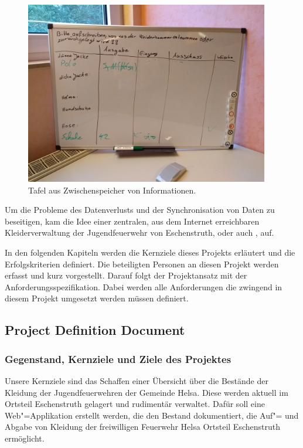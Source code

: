 \begin{figure}[hbtp]
  \centering
  \includegraphics[width=0.95\textwidth]{res/IMG_20180815_193814370}
  \caption{Tafel aus Zwischenspeicher von Informationen.}
  \label{fig:tafel}
\end{figure}

Um die Probleme des Datenverlusts und der Synchronisation von Daten zu beseitigen, kam die Idee einer zentralen, aus dem Internet erreichbaren Kleiderverwaltung der Jugendfeuerwehr von Eschenstruth, oder auch \project, auf.

In den folgenden Kapiteln werden die Kernziele dieses Projekts erläutert und die Erfolgskriterien definiert. Die beteiligten Personen an diesen Projekt werden erfasst und kurz vorgestellt. Darauf folgt der Projektansatz mit der Anforderungsspezifikation. Dabei werden alle Anforderungen die zwingend in diesem Projekt umgesetzt werden müssen definiert. 

\subsection{Project Definition Document}

\subsubsection{Gegenstand, Kernziele und Ziele des Projektes}

Unsere Kernziele sind das Schaffen einer Übersicht über die Bestände der Kleidung der Jugendfeuerwehren der Gemeinde Helsa. Diese werden aktuell im Ortsteil Eschenstruth gelagert und rudimentär verwaltet. Dafür soll eine Web"=Applikation erstellt werden, die den Bestand dokumentiert, die Auf"= und Abgabe von Kleidung der freiwilligen Feuerwehr Helsa Ortsteil Eschenstruth ermöglicht. 

